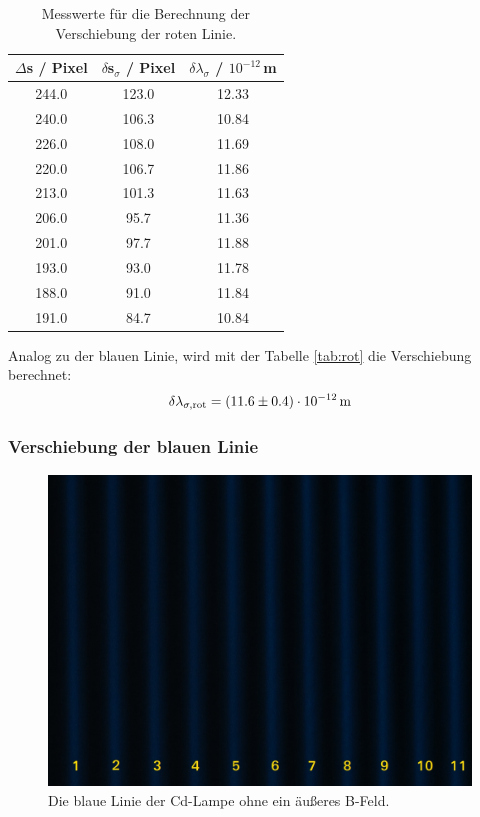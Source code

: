 \begin{table}[H]
  \centering
  \caption{Messwerte für die Berechnung der Verschiebung der roten Linie.}
  \label{tab:rot}
  \begin{tabular}{c c c}
    $\Delta$s / Pixel & $\delta$s$_{\sigma}$ / Pixel & $\delta \lambda_{\sigma}$ / $10^{-12}$\,m \\
    \hline
    244.0 & 123.0 & 12.33 \\
    240.0 & 106.3 & 10.84 \\
    226.0 & 108.0 & 11.69 \\
    220.0 & 106.7 & 11.86 \\
    213.0 & 101.3 & 11.63 \\
    206.0 & 95.7  & 11.36 \\
    201.0 & 97.7  & 11.88 \\
    193.0 & 93.0  & 11.78 \\
    188.0 & 91.0  & 11.84 \\
    191.0 & 84.7  & 10.84 \\
    \hline
  \end{tabular}
\end{table}

Analog zu der blauen Linie, wird mit der Tabelle \eqref{tab:rot} die Verschiebung berechnet:
\begin{align*}
  \delta \lambda_{\sigma,\text{rot}} = (\num{11.6 +- 0.4})\cdot 10^{-12}\,\text{m} \\
\end{align*}



\subsubsection{Verschiebung der blauen Linie}
\begin{figure}[H]
  \centering
  \includegraphics[width=0.8\linewidth]{Bilder/BoB.JPG}
  \caption{Die blaue Linie der Cd-Lampe ohne ein äußeres B-Feld.}
  \label{fig:BoB}
\end{figure}

